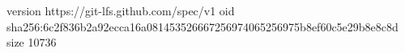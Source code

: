 version https://git-lfs.github.com/spec/v1
oid sha256:6c2f836b2a92ecca16a081453526667256974065256975b8ef60c5e29b8e8c8d
size 10736
